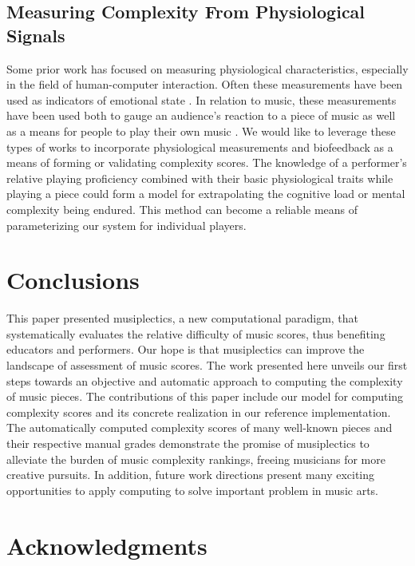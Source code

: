 \documentclass[10pt,preprint]{sigplanconf}
\begin{document}
\subsection{Measuring Complexity From Physiological Signals}
\label{sec:physio}

Some prior work has focused on measuring physiological characteristics, especially in the field of human-computer interaction. Often these measurements have been used as indicators of emotional state \cite{Physio}. In relation to music, these measurements have been used both to gauge an audience's reaction to a piece of music as well as a means for people to play their own music \cite{Controller} \cite{Tanaka2002}. We would like to leverage these types of works to incorporate physiological measurements and biofeedback as a means of forming or validating complexity scores. The knowledge of a performer's relative playing proficiency combined with their basic physiological traits while playing a piece could form a model for extrapolating the cognitive load or mental complexity being endured. This method can become a reliable means of parameterizing our system for individual players.

\section{Conclusions} 
\label{sec:conclu}

This paper presented musiplectics, a new computational paradigm, that systematically evaluates the relative difficulty of music scores, thus benefiting educators and performers. Our hope is that musiplectics can improve the landscape of assessment of music scores. The work presented here unveils our first steps towards an objective and automatic approach to computing the complexity of music pieces. The contributions of this paper include our model for computing complexity scores and its concrete realization in our reference implementation. The automatically computed complexity scores of many well-known pieces and their respective manual grades demonstrate the promise of musiplectics to alleviate the burden of music complexity rankings, freeing musicians for more creative pursuits. In addition, future work directions present many exciting opportunities to apply computing to solve important problem in music arts.

\section*{Acknowledgments} 
\label{sec:ack}
\end{document}
